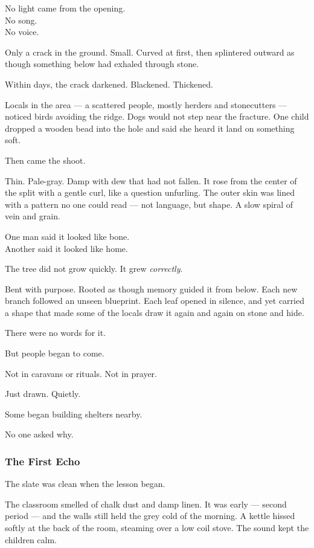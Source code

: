 \documentclass[12pt]{article}
\begin{document}
No light came from the opening.\\
No song.\\
No voice.

Only a crack in the ground. Small. Curved at first, then splintered outward as though something below had exhaled through stone.

Within days, the crack darkened. Blackened. Thickened.

Locals in the area --- a scattered people, mostly herders and stonecutters --- noticed birds avoiding the ridge. Dogs would not step near the fracture. One child dropped a wooden bead into the hole and said she heard it land on something soft.

Then came the shoot.

Thin. Pale-gray. Damp with dew that had not fallen. It rose from the center of the split with a gentle curl, like a question unfurling. The outer skin was lined with a pattern no one could read --- not language, but shape. A slow spiral of vein and grain.

One man said it looked like bone.\\
Another said it looked like home.

\vspace{1em}

The tree did not grow quickly. It grew \textit{correctly}.

Bent with purpose. Rooted as though memory guided it from below. Each new branch followed an unseen blueprint. Each leaf opened in silence, and yet carried a shape that made some of the locals draw it again and again on stone and hide.

There were no words for it.

But people began to come.

Not in caravans or rituals. Not in prayer.

Just drawn. Quietly.

Some began building shelters nearby.

No one asked why.

\dotfill

\subsubsection*{The First Echo}

The slate was clean when the lesson began.

The classroom smelled of chalk dust and damp linen. It was early --- second period --- and the walls still held the grey cold of the morning. A kettle hissed softly at the back of the room, steaming over a low coil stove. The sound kept the children calm.
\end{document}
